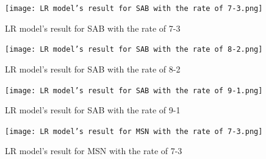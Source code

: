 \documentclass{ieeeojies}
\begin{document}
   \begin{figure}[H]
    \centering
    \begin{minipage}{0.23\textwidth}
    \centering
    \texttt{[image: LR model’s result for SAB with the rate of 7-3.png]}
    \caption{LR model’s result for SAB with the rate of 7-3}
    \end{minipage}
    \hfill
    \begin{minipage}{0.23\textwidth}
    \centering
    \texttt{[image: LR model’s result for SAB with the rate of 8-2.png]}
    \caption{LR model’s result for SAB with the rate of 8-2}
    \end{minipage}
    \end{figure}
    
    \begin{figure}[H]
    \begin{minipage}{0.23\textwidth}
    \centering
    \texttt{[image: LR model’s result for SAB with the rate of 9-1.png]}
    \caption{LR model’s result for SAB with the rate of 9-1}
    \end{minipage}
    \hfill
    \begin{minipage}{0.23\textwidth}
    \centering
    \texttt{[image: LR model’s result for MSN with the rate of 7-3.png]}
    \caption{LR model’s result for MSN with the rate of 7-3}
    \end{minipage}
   \end{figure}
\end{document}
